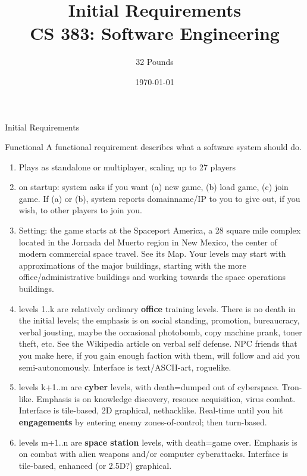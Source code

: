 \documentclass[12pt]{report}
\begin{document}
\title{Initial Requirements\\ \vspace{2 mm} {\large CS 383: Software Engineering}}

\author{32 Pounds}
\date{\today}
\maketitle
\clearpage

\begin{chapter}{Initial Requirements}
\begin{subsection}{Functional}
A functional requirement describes what a software system should do.\\

\begin{enumerate}
\item Plays as standalone or multiplayer, scaling up to 27 players
\item on startup: system asks if you want (a) new game, (b) load game, (c) join game. If (a) or (b), system reports domainname/IP to you to give out, if you wish, to other players to join you.
\item Setting: the game starts at the Spaceport America, a 28 square mile complex located in the Jornada del Muerto region in New Mexico, the center of modern commercial space travel. See its Map. Your levels may start with approximations of the major buildings, starting with the more office/administrative buildings and working towards the space operations buildings.
\item levels 1..k are relatively ordinary \textbf {office} training levels. There is no death in the initial levels; the emphasis is on social standing, promotion, bureaucracy, verbal jousting, maybe the occasional photobomb, copy machine prank, toner theft, etc. See the Wikipedia article on verbal self defense. NPC friends that you make here, if you gain enough faction with them, will follow and aid you semi-autonomously. Interface is text/ASCII-art, roguelike.
\item levels k+1..m are \textbf{cyber} levels, with death=dumped out of cyberspace. Tron-like. Emphasis is on knowledge discovery, resouce acquisition, virus combat. Interface is tile-based, 2D graphical, nethacklike. Real-time until you hit \textbf{engagements} by entering enemy zones-of-control; then turn-based.
\item levels m+1..n are \textbf{space station} levels, with death=game over. Emphasis is on combat with alien weapons and/or computer cyberattacks. Interface is tile-based, enhanced (or 2.5D?) graphical.
\end{enumerate}
\end{subsection}


\end{chapter}
\end{document}
